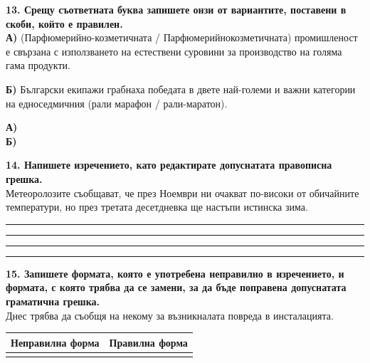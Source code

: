 \documentclass[12pt,a4paper]{article}
\begin{document}
\vspace{0.6cm}

\noindent
\textbf{13. Срещу съответната буква запишете онзи от вариантите, поставени в скоби, който е правилен.} \\
\textbf{А)} (Парфюмерийно-козметичната / Парфюмерийнокозметичната) промишленост е свързана с използването на естествени суровини за производство на голяма гама продукти. \\

\vspace{-0.3cm}

\noindent
\textbf{Б)} Български екипажи грабнаха победата в двете най-големи и важни категории на едноседмичния (рали марафон / рали-маратон).

\vspace{0.3cm}
\noindent\textbf{А)} \dotfill \\
\noindent\textbf{Б)} \dotfill

\vspace{0.6cm}

\noindent
\textbf{14. Напишете изречението, като редактирате допуснатата правописна грешка.} \\
Метеоролозите съобщават, че през Ноември ни очакват по-високи от обичайните температури, но през третата десетдневка ще настъпи истинска зима.

\vspace{0.2cm}
\noindent\rule{\linewidth}{0.4pt}
\noindent\rule{\linewidth}{0.4pt}
\noindent\rule{\linewidth}{0.4pt}
\noindent\rule{\linewidth}{0.4pt}


\vspace{0.6cm}

\noindent
\textbf{15. Запишете формата, която е употребена неправилно в изречението, и формата, с която трябва да се замени, за да бъде поправена допуснатата граматична грешка.} \\

\vspace{-0.2cm}
\noindent
Днес трябва да съобщя на некому за възникналата повреда в инсталацията.
\vspace{0.2cm}

\vspace{0.2cm}
\noindent
\begin{tabularx}{\linewidth}{|>{\centering\arraybackslash}X|>{\centering\arraybackslash}X|}
\hline
\textbf{Неправилна форма} & \textbf{Правилна форма} \\
\hline
 &  \\
\hline
\end{tabularx}
\end{document}
